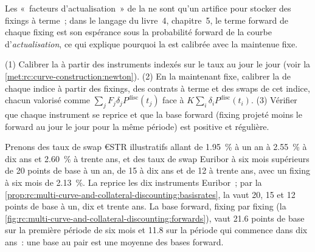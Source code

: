 Les «~facteurs d'actualisation~» de la  ne sont qu'un artifice pour stocker
des fixings à terme~; dans le langage du livre~4, chapitre~5, le terme forward de chaque
fixing est son espérance sous la probabilité forward de la courbe
d'\emph{actualisation}, ce qui explique pourquoi la  est calibrée avec
la  maintenue fixe.

\begin{method}\label{met:rc:multi-curve-and-collateral-discounting:twostage}
(1) Calibrer la  à partir des instruments indexés sur le taux au jour le
jour (voir la \cref{met:rc:curve-construction:newton}). (2) En la maintenant fixe, calibrer la  de chaque indice à partir des fixings, des contrats à terme et des swaps de cet indice,
chacun valorisé comme $\sum_j F_j\delta_jP^{\text{disc}}(t_j)$ face à $K\sum_i
\delta_iP^{\text{disc}}(t_i)$. (3) Vérifier que chaque instrument se reprice et que la
base forward (fixing projeté moins le forward au jour le jour pour la
même période) est positive et régulière.
\end{method}

\label{lst:rc:multi-curve-and-collateral-discounting:proj}

\begin{example}\label{ex:rc:multi-curve-and-collateral-discounting:euro}
Prenons des taux de swap €STR illustratifs allant de 1.95~\% à un an à 2.55~\% à dix ans
et 2.60~\% à trente ans, et des taux de swap Euribor à six mois supérieurs de 20 points de base à un an,
de 15 à dix ans et de 12 à trente ans, avec un fixing à six mois de 2.13~\%. La
 reprice les dix instruments Euribor~; par la
\cref{prop:rc:multi-curve-and-collateral-discounting:basisrates}, la  vaut 20, 15 et 12
points de base à un, dix et trente ans. La base forward, fixing par fixing (la
\cref{fig:rc:multi-curve-and-collateral-discounting:forwards}), vaut 21.6 points de base sur la
première période de six mois et 11.8 sur la période qui commence dans dix ans~: une base
au pair est une moyenne des bases forward.
\end{example}

